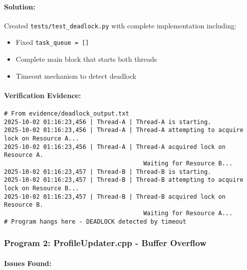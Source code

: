 \documentclass[11pt,a4paper]{article}
\begin{document}
\paragraph{Solution:}
Created \texttt{tests/test\_deadlock.py} with complete implementation including:
\begin{itemize}
    \item Fixed \texttt{task\_queue = []}
    \item Complete main block that starts both threads
    \item Timeout mechanism to detect deadlock
\end{itemize}

\paragraph{Verification Evidence:}
\begin{verbatim}
# From evidence/deadlock_output.txt
2025-10-02 01:16:23,456 | Thread-A | Thread-A is starting.
2025-10-02 01:16:23,456 | Thread-A | Thread-A attempting to acquire lock on Resource A...
2025-10-02 01:16:23,456 | Thread-A | Thread-A acquired lock on Resource A.
                                       Waiting for Resource B...
2025-10-02 01:16:23,457 | Thread-B | Thread-B is starting.
2025-10-02 01:16:23,457 | Thread-B | Thread-B attempting to acquire lock on Resource B...
2025-10-02 01:16:23,457 | Thread-B | Thread-B acquired lock on Resource B.
                                       Waiting for Resource A...
# Program hangs here - DEADLOCK detected by timeout
\end{verbatim}

\subsubsection{Program 2: ProfileUpdater.cpp - Buffer Overflow}

\paragraph{Issues Found:}
\end{document}
